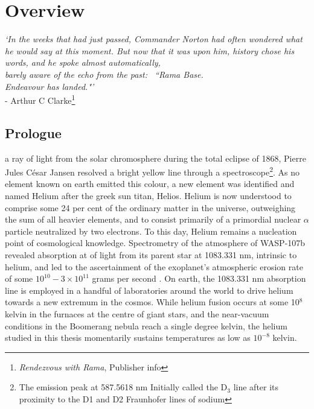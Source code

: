 




\chapter*{Overview}


\begin{adjustwidth}{3cm}{0cm}
\begin{flushright}
{\emph{`In the weeks that had just passed, Commander Norton had often wondered what he would say at this moment.
	But now that it was upon him, history chose his words, and he spoke almost automatically, \\barely aware of the echo from the past: ~``Rama Base.\\ \emph{Endeavour} has landed."'}\\ 
- Arthur C Clarke\footnote{\emph{Rendezvous with Rama}, Publisher info}}
\end{flushright}
\end{adjustwidth}

\section*{Prologue}\label{sec:prologue}





	 a ray of light from the solar chromosphere during the total eclipse of 1868, Pierre Jules C\'{e}sar Jansen resolved a bright yellow line through a spectroscope\footnote{The emission peak at 587.5618 nm Initially called the D$_3$ line after its proximity to the D1 and D2 Fraunhofer lines of sodium}. As no element known on earth emitted this colour, a new element was identified and named Helium after the greek sun titan, Helios. Helium is now understood to comprise some 24 per cent of the ordinary matter in the universe, outweighing the sum of all heavier elements, and to consist primarily of a primordial nuclear $\alpha$ particle neutralized by two electrons. To this day, Helium remains a nucleation point of cosmological knowledge. Spectrometry of the atmosphere of WASP-107b revealed absorption at of light from its parent star at 1083.331 nm, intrinsic to helium, and led to the ascertainment of the exoplanet's atmospheric erosion rate of some $10^{10}-3\times10^{11}$ grams per second \cite{Spake18}. On earth, the 1083.331 nm absorption line is employed in a handful of laboratories around the world to drive helium towards a new extremum in the cosmos. While helium fusion occurs at some 10$^8$ kelvin in the furnaces at the centre of giant stars, and the near-vacuum conditions in the Boomerang nebula reach a single degree kelvin, the helium studied in this thesis momentarily sustains temperatures as low as $10^{-8}$ kelvin. 

